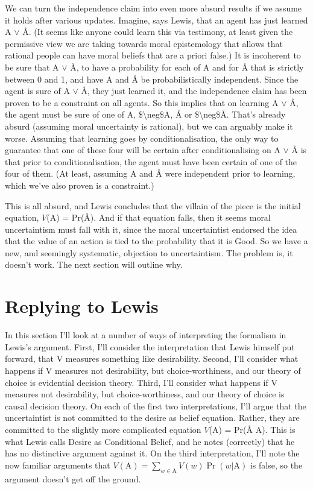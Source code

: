 We can turn the independence claim into even more absurd results if we assume it holds after various updates. Imagine, says Lewis, that an agent has just learned A $\vee$ Å. (It seems like anyone could learn this via testimony, at least given the permissive view we are taking towards moral epistemology that allows that rational people can have moral beliefs that are a priori false.) It is incoherent to be sure that A $\vee$ Å, to have a probability for each of A and for Å that is strictly between 0 and 1, and have A and Å be probabilistically independent. Since the agent is sure of A $\vee$ Å, they just learned it, and the independence claim has been proven to be a constraint on all agents. So this implies that on learning A $\vee$ Å, the agent must be sure of one of A, \$\textbackslash{}neg\$A, Å or \$\textbackslash{}neg\$Å. That's already absurd (assuming moral uncertainty is rational), but we can arguably make it worse. Assuming that learning goes by conditionalisation, the only way to guarantee that one of these four will be certain after conditionalising on A $\vee$ Å is that prior to conditionalisation, the agent must have been certain of one of the four of them. (At least, assuming A and Å were independent prior to learning, which we've also proven is a constraint.)

This is all absurd, and Lewis concludes that the villain of the piece is the initial equation, $V$(A) = Pr(Å). And if that equation falls, then it seems moral uncertaintism must fall with it, since the moral uncertaintist endorsed the idea that the value of an action is tied to the probability that it is Good. So we have a new, and seemingly systematic, objection to uncertaintism. The problem is, it doesn't work. The next section will outline why.

\section{Replying to Lewis}
\label{replyingtolewis}

In this section I'll look at a number of ways of interpreting the formalism in Lewis's argument. First, I'll consider the interpretation that Lewis himself put forward, that V measures something like desirability. Second, I'll consider what happens if V measures not desirability, but choice-worthiness, and our theory of choice is evidential decision theory. Third, I'll consider what happens if V measures not desirability, but choice-worthiness, and our theory of choice is causal decision theory. On each of the first two interpretations, I'll argue that the uncertaintist is not committed to the desire as belief equation. Rather, they are committed to the slightly more complicated equation $V$(A) = Pr(Å \textbar{} A). This is what Lewis calls Desire as Conditional Belief, and he notes (correctly) that he has no distinctive argument against it. On the third interpretation, I'll note the now familiar arguments that $V(\text{A}) = \sum_{w \in \text{A}} V(w) \Pr(w | \text{A})$ is false, so the argument doesn't get off the ground.

